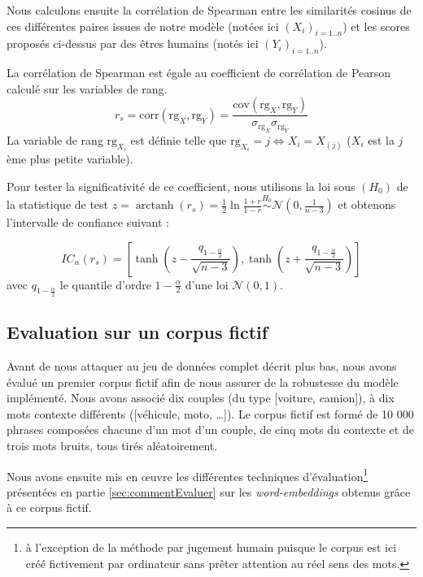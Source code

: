 \documentclass[11pt,french,french]{article}
\let\rmarkdownfootnote\footnote%
\def\footnote{\protect\rmarkdownfootnote}
\DeclareMathOperator{\arctanh}{arctanh}
\begin{document}
Nous calculons ensuite la corrélation de Spearman entre les similarités cosinus de ces différentes paires issues de notre modèle (notées ici \((X_i)_{i=1..n}\)) et les scores proposés ci-dessus par des êtres humains (notés ici \((Y_i)_{i=1..n}\)).

La corrélation de Spearman est égale au coefficient de corrélation de Pearson calculé sur les variables de rang.
\[
r_s = \mathrm{corr}(\mathrm{rg}_X, \mathrm{rg}_Y) = 
\frac{\mathrm{cov}(\mathrm{rg}_X, \mathrm{rg}_Y)}{
\sigma_{\mathrm{rg}_X} \sigma_{\mathrm{rg}_Y}
}
\]
La variable de rang \(\mathrm{rg}_{X_i}\) est définie telle que \(\mathrm{rg}_{X_i}=j \iff X_i = X_{(j)}\) (\(X_i\) est la \(j\)ème plus petite variable).

Pour tester la significativité de ce coefficient, nous utilisons la loi sous \((H_0)\) de la statistique de test \(z = \arctanh(r_s) = \frac{1}{2} \ln\frac{1+r}{1-r} \overset{H_0}{\sim}\mathcal{N}(0, \frac{1}{n-3})\) et obtenons l'intervalle de confiance suivant :

\[
IC_\alpha (r_s) = \left[\tanh\left(z-\frac{q_{1-\frac{\alpha}{2}}}{\sqrt{n-3}}\right),
\tanh\left(z+\frac{q_{1-\frac{\alpha}{2}}}{\sqrt{n-3}}\right)\right]
\]
avec \(q_{1-\frac{\alpha}{2}}\) le quantile d'ordre \(1-\frac{\alpha}{2}\) d'une loi \(\mathcal{N}(0, 1)\).

\hypertarget{sec:corpusFictif}{%
\subsection{Evaluation sur un corpus fictif}\label{sec:corpusFictif}}

Avant de nous attaquer au jeu de données complet décrit plus bas, nous avons évalué un premier corpus fictif afin de nous assurer de la robustesse du modèle implémenté. Nous avons associé dix couples (du type {[}voiture, camion{]}), à dix mots contexte différents ({[}véhicule, moto, \dots{]}).
Le corpus fictif est formé de 10 000 phrases composées chacune d'un mot d'un couple, de cinq mots du contexte et de trois mots bruits, tous tirés aléatoirement.

Nous avons ensuite mis en œuvre les différentes techniques d'évaluation\footnote{à l'exception de la méthode par \og jugement humain \fg{} puisque le corpus est ici créé fictivement par ordinateur sans prêter attention au réel sens des mots.} présentées en partie \ref{sec:commentEvaluer} sur les \emph{word-embeddings} obtenus grâce à ce corpus fictif.
\end{document}
